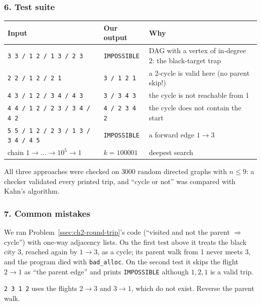 \subsubsection*{6. Test suite}

\begin{testbox}
\centering\small
\begin{tabular}{@{}p{5.6cm}lp{5.6cm}@{}}
\toprule
\textbf{Input} & \textbf{Our output} & \textbf{Why} \\
\midrule
\texttt{3 3 / 1 2 / 1 3 / 2 3} & \texttt{IMPOSSIBLE} & DAG with a vertex of in-degree 2: the black-target trap \\
\texttt{2 2 / 1 2 / 2 1} & \texttt{3 / 1 2 1} & a 2-cycle is valid here (no parent skip!) \\
\texttt{4 3 / 1 2 / 3 4 / 4 3} & \texttt{3 / 3 4 3} & the cycle is not reachable from 1 \\
\texttt{4 4 / 1 2 / 2 3 / 3 4 / 4 2} & \texttt{4 / 2 3 4 2} & the cycle does not contain the start \\
\texttt{5 5 / 1 2 / 2 3 / 1 3 / 3 4 / 4 5} & \texttt{IMPOSSIBLE} & a forward edge $1 \to 3$ \\
chain $1 \to \dots \to 10^5 \to 1$ & $k = 100001$ & deepest search \\
\bottomrule
\end{tabular}
\end{testbox}
All three approaches were checked on $3000$ random directed graphs with $n \le 9$: a checker validated every printed trip, and ``cycle or not'' was compared with Kahn's algorithm.

\subsubsection*{7. Common mistakes}

\begin{warningbox}
We ran Problem~\ref{ssec:ch2-round-trip}'s code (``visited and not the parent $\Rightarrow$ cycle'') with one-way adjacency lists. On the first test above it treats the black city 3, reached again by $1 \to 3$, as a cycle; its parent walk from 1 never meets 3, and the program died with \texttt{bad\_alloc}. On the second test it skips the flight $2 \to 1$ as ``the parent edge'' and prints \texttt{IMPOSSIBLE} although $1, 2, 1$ is a valid trip.
\end{warningbox}

\begin{warningbox}
\texttt{2 3 1 2} uses the flights $2 \to 3$ and $3 \to 1$, which do not exist. Reverse the parent walk.
\end{warningbox}

